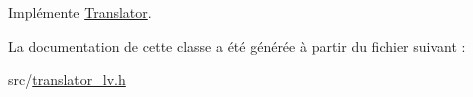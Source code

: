Implémente \hyperlink{class_translator_a31e719b4e290a359ddbb78132bf3f494}{Translator}.



La documentation de cette classe a été générée à partir du fichier suivant \+:\begin{DoxyCompactItemize}
\item 
src/\hyperlink{translator__lv_8h}{translator\+\_\+lv.\+h}\end{DoxyCompactItemize}
